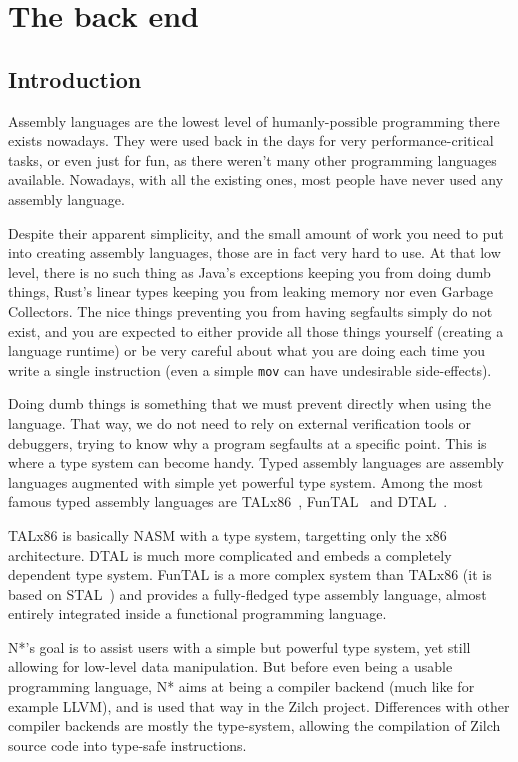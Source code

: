 \part{The back end}\label{part:nstar}


\chapter{Introduction}\label{chap:nstar-abstract}

Assembly languages are the lowest level of humanly-possible programming there exists nowadays. They were used back in the days for very performance-critical tasks, or even just for fun, as there weren't many other programming languages available. Nowadays, with all the existing ones, most people have never used any assembly language.

Despite their apparent simplicity, and the small amount of work you need to put into creating assembly languages, those are in fact very hard to use. At that low level, there is no such thing as Java's exceptions keeping you from doing dumb things, Rust's linear types keeping you from leaking memory nor even Garbage Collectors. The nice things preventing you from having segfaults simply do not exist, and you are expected to either provide all those things yourself (creating a language runtime) or be very careful about what you are doing each time you write a single instruction (even a simple \texttt{mov} can have undesirable side-effects).

Doing dumb things is something that we must prevent directly when using the language. That way, we do not need to rely on external verification tools or debuggers, trying to know why a program segfaults at a specific point.
This is where a type system can become handy. Typed assembly languages are assembly languages augmented with simple yet powerful type system. Among the most famous typed assembly languages are TALx86~\cite{TALx86}, FunTAL~\cite{FunTAL} and DTAL~\cite{DTAL}.

TALx86 is basically NASM with a type system, targetting only the x86 architecture. DTAL is much more complicated and embeds a completely dependent type system. FunTAL is a more complex system than TALx86 (it is based on STAL~\cite{STAL}) and provides a fully-fledged type assembly language, almost entirely integrated inside a functional programming language.

\vspace{\baselineskip}

N*'s goal is to assist users with a simple but powerful type system, yet still allowing for low-level data manipulation.
But before even being a usable programming language, N* aims at being a compiler backend (much like for example LLVM), and is used that way in the Zilch project. Differences with other compiler backends are mostly the type-system, allowing the compilation of Zilch source code into type-safe instructions.

